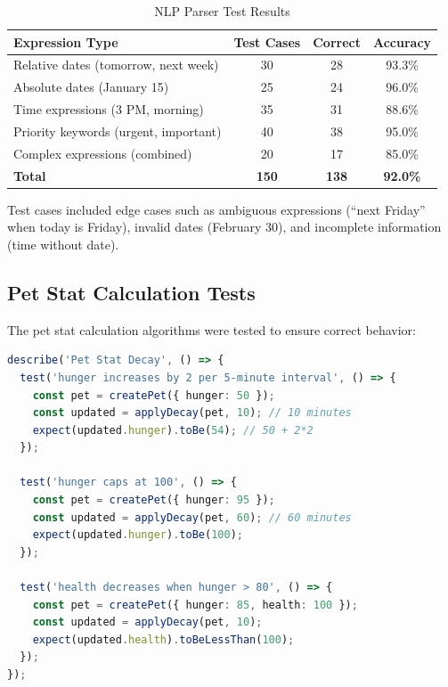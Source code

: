 \begin{table}[htbp]
\centering
\caption{NLP Parser Test Results}
\label{tab:nlp-tests}
\begin{tabular}{@{}lccc@{}}
\toprule
\textbf{Expression Type} & \textbf{Test Cases} & \textbf{Correct} & \textbf{Accuracy} \\
\midrule
Relative dates (tomorrow, next week) & 30 & 28 & 93.3\% \\
Absolute dates (January 15) & 25 & 24 & 96.0\% \\
Time expressions (3 PM, morning) & 35 & 31 & 88.6\% \\
Priority keywords (urgent, important) & 40 & 38 & 95.0\% \\
Complex expressions (combined) & 20 & 17 & 85.0\% \\
\midrule
\textbf{Total} & \textbf{150} & \textbf{138} & \textbf{92.0\%} \\
\bottomrule
\end{tabular}
\end{table}

Test cases included edge cases such as ambiguous expressions (``next Friday'' when today is Friday), invalid dates (February 30), and incomplete information (time without date).

\subsection{Pet Stat Calculation Tests}

The pet stat calculation algorithms were tested to ensure correct behavior:

\begin{lstlisting}[language=TypeScript, caption=Pet Stat Calculation Test Cases]
describe('Pet Stat Decay', () => {
  test('hunger increases by 2 per 5-minute interval', () => {
    const pet = createPet({ hunger: 50 });
    const updated = applyDecay(pet, 10); // 10 minutes
    expect(updated.hunger).toBe(54); // 50 + 2*2
  });
  
  test('hunger caps at 100', () => {
    const pet = createPet({ hunger: 95 });
    const updated = applyDecay(pet, 60); // 60 minutes
    expect(updated.hunger).toBe(100);
  });
  
  test('health decreases when hunger > 80', () => {
    const pet = createPet({ hunger: 85, health: 100 });
    const updated = applyDecay(pet, 10);
    expect(updated.health).toBeLessThan(100);
  });
});
\end{lstlisting}

